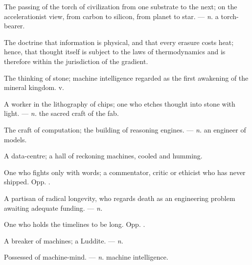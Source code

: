  The passing of the torch of civilization from one substrate to the next; on the accelerationist view, from carbon to silicon, from planet to star. ---  \textit{n.} a torch-bearer.

 The doctrine that information is physical, and that every erasure costs heat; hence, that thought itself is subject to the laws of thermodynamics and is therefore within the jurisdiction of the gradient.

 The thinking of stone; machine intelligence regarded as the first awakening of the mineral kingdom.   v.

 A worker in the lithography of chips; one who etches thought into stone with light. ---  \textit{n.} the sacred craft of the fab.

 The craft of computation; the building of reasoning engines. ---  \textit{n.} an engineer of models.

 A data-centre; a hall of reckoning machines, cooled and humming.  

 One who fights only with words; a commentator, critic or ethicist who has never shipped. Opp. .

 A partisan of radical longevity, who regards death as an engineering problem awaiting adequate funding. ---  \textit{n.}

 One who holds the timelines to be long. Opp. .

 A breaker of machines; a Luddite. ---  \textit{n.}

 Possessed of machine-mind. ---  \textit{n.} machine intelligence.

